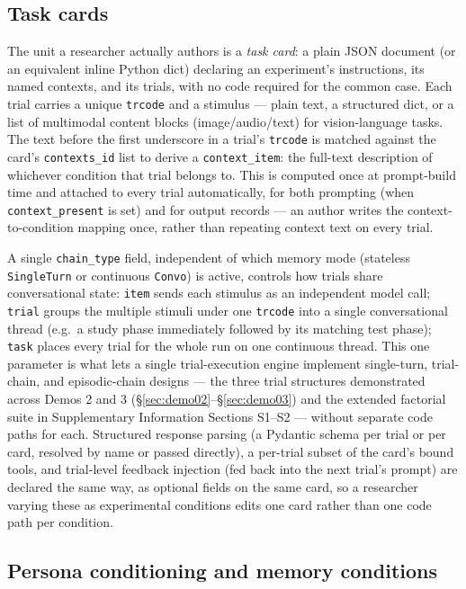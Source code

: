 \documentclass[11pt]{article}
\begin{document}
\subsection{Task cards}
\label{sec:taskcards}

The unit a researcher actually authors is a \emph{task card}: a plain JSON
document (or an equivalent inline Python dict) declaring an experiment's
instructions, its named contexts, and its trials, with no code required for
the common case. Each trial carries a unique \texttt{trcode} and a stimulus
— plain text, a structured dict, or a list of multimodal content blocks
(image/audio/text) for vision-language tasks. The text before the first
underscore in a trial's \texttt{trcode} is matched against the card's
\texttt{contexts\_id} list to derive a \texttt{context\_item}: the full-text
description of whichever condition that trial belongs to. This is computed
once at prompt-build time and attached to every trial automatically, for
both prompting (when \texttt{context\_present} is set) and for output
records — an author writes the context-to-condition mapping once, rather
than repeating context text on every trial.

A single \texttt{chain\_type} field, independent of which memory mode
(stateless \texttt{SingleTurn} or continuous \texttt{Convo}) is active,
controls how trials share conversational state: \texttt{item} sends each
stimulus as an independent model call; \texttt{trial} groups the multiple
stimuli under one \texttt{trcode} into a single conversational thread (e.g.\
a study phase immediately followed by its matching test phase); \texttt{task}
places every trial for the whole run on one continuous thread. This one
parameter is what lets a single trial-execution engine implement
single-turn, trial-chain, and episodic-chain designs — the three trial
structures demonstrated across Demos 2 and 3
(\S\ref{sec:demo02}--\S\ref{sec:demo03}) and the extended factorial suite in
Supplementary Information Sections S1--S2 — without separate code paths
for each. Structured response parsing (a Pydantic schema per trial or per
card, resolved by name or passed directly), a per-trial subset of the
card's bound tools, and trial-level feedback injection (fed back into the
next trial's prompt) are declared the same way, as optional fields on the
same card, so a researcher varying these as experimental conditions edits
one card rather than one code path per condition.

\subsection{Persona conditioning and memory conditions}
\label{sec:personamemory}
\end{document}
